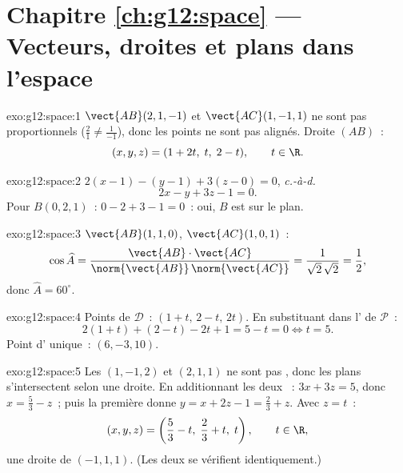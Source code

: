 \section*{Chapitre \ref{ch:g12:space} --- Vecteurs, droites et plans dans l'espace}

\begin{solution}{exo:g12:space:1}
$\vect{AB}(2, 1, -1)$ et $\vect{AC}(1, -1, 1)$ ne sont pas proportionnels
($\frac21 \neq \frac{1}{-1}$), donc les points ne sont pas alignés. Droite
$(AB)$~:
\[
(x, y, z) = (1 + 2t,\; t,\; 2 - t), \qquad t \in \R .
\]
\end{solution}

\begin{solution}{exo:g12:space:2}
$2(x - 1) - (y - 1) + 3(z - 0) = 0$, \emph{c.-à-d.}
\[
2x - y + 3z - 1 = 0 .
\]
Pour $B(0,2,1)$~: $0 - 2 + 3 - 1 = 0$~: oui, $B$ est sur le plan.
\end{solution}

\begin{solution}{exo:g12:space:3}
$\vect{AB}(1,1,0)$, $\vect{AC}(1,0,1)$~:
\[
\cos\widehat{A}
= \frac{\vect{AB}\cdot\vect{AC}}{\norm{\vect{AB}}\,\norm{\vect{AC}}}
= \frac{1}{\sqrt2\,\sqrt2} = \frac12,
\]
donc $\widehat A = 60^\circ$.
\end{solution}

\begin{solution}{exo:g12:space:4}
Points de $\mathcal D$~: $(1 + t,\, 2 - t,\, 2t)$. En substituant dans
l' de $\mathcal P$~:
\[
2(1+t) + (2 - t) - 2t + 1 = 5 - t = 0 \iff t = 5 .
\]
Point d' unique~: $(6, -3, 10)$.
\end{solution}

\begin{solution}{exo:g12:space:5}
Les  $(1, -1, 2)$ et $(2, 1, 1)$ ne sont pas ,
donc les plans s'intersectent selon une droite. En additionnant les deux
~: $3x + 3z = 5$, donc $x = \frac53 - z$~; puis la première
 donne $y = x + 2z - 1 = \frac23 + z$. Avec $z = t$~:
\[
(x, y, z) = \left(\frac53 - t,\; \frac23 + t,\; t\right), \qquad t \in \R,
\]
une droite de  $(-1, 1, 1)$. (Les deux  se
vérifient identiquement.)
\end{solution}

